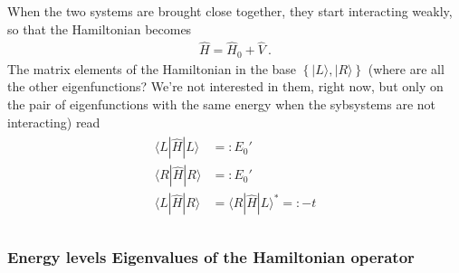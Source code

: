 \documentclass[letterpaper,10pt,english]{jupyterBook}
\begin{document}
\sphinxAtStartPar
When the two systems are brought close together, they start interacting weakly, so that the Hamiltonian becomes
\begin{equation*}
\begin{split}\hat{H} = \hat{H}_0 + \hat{V} \ .\end{split}
\end{equation*}
\sphinxAtStartPar
The matrix elements of the Hamiltonian in the base \(\left\{ | L \rangle, | R \rangle \right\}\) (where are all the other eigen\sphinxhyphen{}functions? We’re not interested in them, right now, but only on the pair of eigenfunctions with the same energy when the syb\sphinxhyphen{}systems are not interacting) read
\begin{equation*}
\begin{split}\begin{aligned}
  \langle L | \hat{H} | L \rangle & =: E_0' \\
  \langle R | \hat{H} | R \rangle & =: E_0' \\
  \langle L | \hat{H} | R \rangle & = \langle R | \hat{H} | L \rangle^* =: -t \\
\end{aligned}\end{split}
\end{equation*}\subsubsection*{Energy levels \sphinxhyphen{} Eigenvalues of the Hamiltonian operator }
\end{document}
